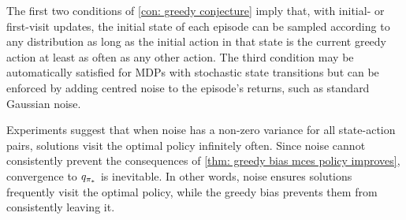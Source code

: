 The first two conditions of \autoref{con: greedy conjecture} imply that, with initial- or first-visit updates, the initial state of each episode can be sampled according to any distribution as long as the initial action in that state is the current greedy action at least as often as any other action.
The third condition may be automatically satisfied for MDPs with stochastic state transitions but can be enforced by adding centred noise to the episode's returns, such as standard Gaussian noise.



\vspace{-0.1cm}

Experiments suggest that when noise has a non-zero variance for all state-action pairs, solutions visit the optimal policy infinitely often.
Since noise cannot consistently prevent the consequences of \autoref{thm: greedy bias mces policy improves}, convergence to $q_{{\pi}_*}$ is inevitable.
In other words,
noise ensures solutions frequently visit the optimal policy, while the greedy bias prevents them from consistently leaving it.




